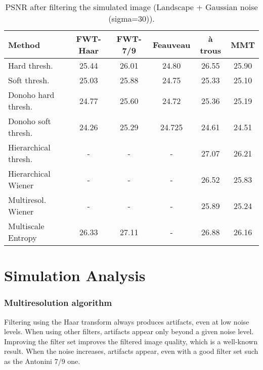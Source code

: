 \begin{table}[hbt]
\begin{center}
\begin{tabular}{lccccc} \hline \hline
Method               & FWT-Haar  & FWT-7/9    & Feauveau & \`a trous & MMT \\ \hline \hline
Hard thresh.         & 25.44 & 26.01 &  24.80   &   26.55  &  25.90  \\
Soft thresh.         & 25.03 & 25.88 &  24.75   &   25.33  &  25.10  \\
Donoho hard thresh.  & 24.77 & 25.60 &  24.72   &   25.36  &  25.19   \\
Donoho soft thresh.  & 24.26 & 25.29 &  24.725  &   24.61  &  24.51   \\
Hierarchical thresh. &     - &  -    &   -      &   27.07  &  26.21   \\
Hierarchical Wiener  &     - &  -    &   -      &   26.52  &  25.83 \\
Multiresol. Wiener   &     - &  -    &   -      &   25.89  &  25.24  \\
Multiscale Entropy   & 26.33 & 27.11 &   -      &   26.88  &  26.16 \\ \hline \hline
\end{tabular}
\caption{PSNR after filtering the simulated image (Landscape + Gaussian noise (sigma=30)).}
\vspace{0.5cm}

\end{center}
\label{comptab}

\end{table}



\section{Simulation Analysis}
\subsubsection*{Multiresolution algorithm} 
 
Filtering using the Haar transform always produces artifacts, even at low 
noise levels.  When using other filters, artifacts appear only beyond a
given noise level. Improving the filter set improves the 
filtered image quality,
which is a well-known result. When the noise increases, artifacts appear,
even with a good filter set such as the Antonini 7/9 one.

